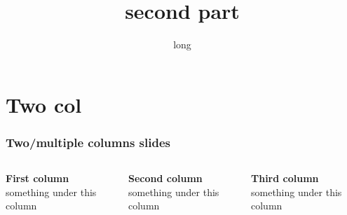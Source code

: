 \documentclass[12pt]{beamer}
\title[second]{second part}
\author{}
\date[short]{long}
\begin{document}
\frame{\titlepage}



\section{Two col}
\begin{frame}
\frametitle{Two/multiple columns slides}


\begin{columns}

\begin{column}{0.3\textwidth}%
{\textbf {First column}}\\
something under this column
\end{column}

\begin{column}{0.3\textwidth}%
{\textbf {Second column}}\\
something under this column
\end{column}

\begin{column}{0.3\textwidth}%
{\textbf {Third column}}\\
something under this column
\end{column}


\end{columns}



\end{frame}
\end{document}
